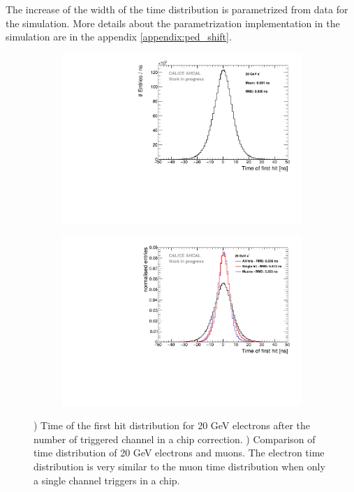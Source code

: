 The increase of the width of the time distribution is parametrized from data for the simulation. More details about the parametrization implementation in the simulation are in the appendix \ref{appendix:ped_shift}.

\begin{figure}[htbp!]
	\begin{subfigure}[t]{0.5\textwidth}
		\centering
		\includegraphics[width=1\textwidth]{../Thesis_Plots/Timing/Electrons/Plots/Timing_AllLayers_20GeV.pdf}
		\caption{}\label{fig:timing_electrons_corr}
	\end{subfigure}
	\hfill
	\begin{subfigure}[t]{0.5\textwidth}
		\centering
		\includegraphics[width=1\textwidth]{../Thesis_Plots/Timing/Electrons/Plots/ComparisonAll_ElectronsSingleHit.pdf}
		\caption{}\label{fig:timing_electron_muon_comp}
	\end{subfigure}
	\caption{) Time of the first hit distribution for 20 GeV electrons after the number of triggered channel in a chip correction. ) Comparison of time distribution of 20 GeV electrons and muons. The electron time distribution is very similar to the muon time distribution when only a single channel triggers in a chip.}
\end{figure}

